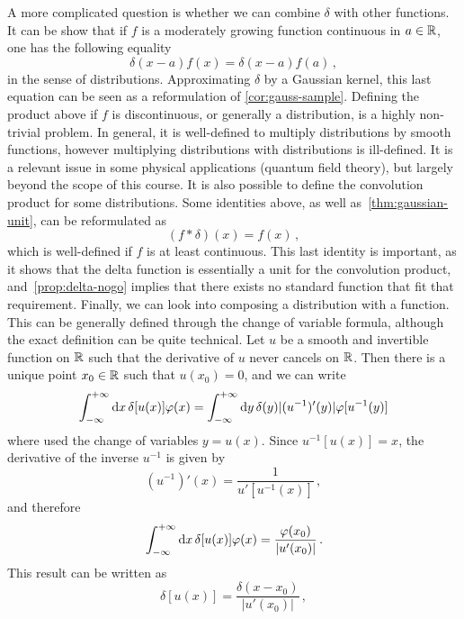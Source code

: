 A more complicated question is whether we can combine $\delta$ with other functions. It
can be show that if $f$ is a moderately growing function continuous in $a\in\mathbb{R}$, one has
the following equality
\begin{equation}
  \delta(x-a)f(x)=\delta(x-a)f(a)\,,
\end{equation}
in the sense of distributions. Approximating $\delta$ by a Gaussian kernel, this last
equation can be seen as a reformulation of \cref{cor:gauss-sample}. Defining the product
above if $f$ is discontinuous, or generally a distribution, is a highly non-trivial
problem. In general, it is well-defined to multiply distributions by smooth functions,
however multiplying distributions with distributions is ill-defined. It is a relevant
issue in some physical applications (\eg quantum field theory), but largely beyond the
scope of this course. It is also possible to define the convolution product for some
distributions. Some identities above, as well as~\cref{thm:gaussian-unit}, can be
reformulated as
\begin{equation}
  (f\ast\delta)(x)=f(x)\,,
\end{equation}
which is well-defined if $f$ is at least continuous. This last identity is important, as
it shows that the delta function is essentially a unit for the convolution product,
and~\cref{prop:delta-nogo} implies that there exists no standard function that fit that
requirement. Finally, we can look into composing a distribution with a function. This can
be generally defined through the change of variable formula, although the exact definition
can be quite technical. Let $u$ be a smooth and invertible function on $\mathbb{R}$ such that the
derivative of $u$ never cancels on $\mathbb{R}$. Then there is a unique point $x_0\in\mathbb{R}$ such that
$u(x_0)=0$, and we can write
\begin{equation}
  \int_{-\infty}^{+\infty}\mathrm{d}{x}\,\delta[u(x)]\varphi(x)=\int_{-\infty}^{+\infty}\mathrm{d}{y}\,\delta(y)|(u^{-1})'(y)|\varphi[u^{-1}(y)]
\end{equation}
where used the change of variables $y=u(x)$. Since $u^{-1}[u(x)]=x$, the derivative of the
inverse $u^{-1}$ is given by
\begin{equation}
  (u^{-1})'(x)=\frac{1}{u'[u^{-1}(x)]}\,,
\end{equation}
and therefore
\begin{equation}
  \int_{-\infty}^{+\infty}\mathrm{d}{x}\,\delta[u(x)]\varphi(x)=\frac{\varphi(x_0)}{|u'(x_0)|}\,.
\end{equation}
This result can be written as
\begin{equation}
  \delta[u(x)]=\frac{\delta(x-x_0)}{|u'(x_0)|}\,,
\end{equation}
